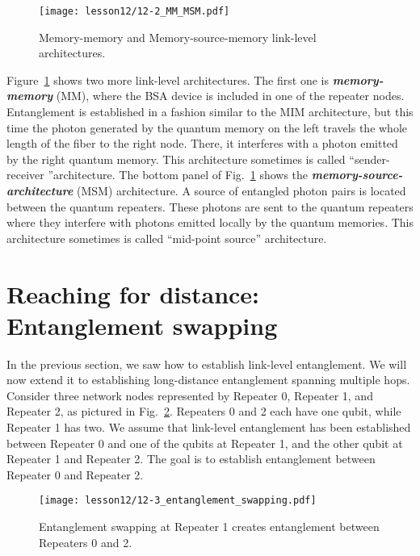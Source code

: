 \begin{figure}[t]
    \centering
    \texttt{[image: lesson12/12-2\_MM\_MSM.pdf]}
    \caption[MM and MSM architectures.]{Memory-memory and Memory-source-memory link-level architectures.}
    \label{fig:12-2_MM_MSM}
\end{figure}

Figure~\ref{fig:12-2_MM_MSM} shows two more link-level architectures.
The first one is \textit{\textbf{memory-memory}} (MM), where the BSA device is included in one of the repeater nodes.
Entanglement is established in a fashion similar to the MIM architecture, but this time the photon generated by the quantum memory on the left travels the whole length of the fiber to the right node.
There, it interferes with a photon emitted by the right quantum memory.
This architecture sometimes is called ``sender-receiver ''architecture.
The bottom panel of Fig.~\ref{fig:12-2_MM_MSM} shows the \textit{\textbf{memory-source-architecture}} (MSM) architecture.
A source of entangled photon pairs is located between the quantum repeaters.
These photons are sent to the quantum repeaters where they interfere with photons emitted locally by the quantum memories. This architecture sometimes is called ``mid-point source'' architecture.


\section{Reaching for distance: Entanglement swapping}
\label{sec:12-3_reaching_for_distance}

In the previous section, we saw how to establish link-level entanglement.
We will now extend it to establishing long-distance entanglement spanning multiple hops.
Consider three network nodes represented by Repeater 0, Repeater 1, and Repeater 2, as pictured in Fig.~\ref{fig:12-3_entanglement_swapping}.
Repeaters 0 and 2 each have one qubit, while Repeater 1 has two.
We assume that link-level entanglement has been established between Repeater 0 and one of the qubits at Repeater 1, and the other qubit at Repeater 1 and Repeater 2.
The goal is to establish entanglement between Repeater 0 and Repeater 2.

\begin{figure}[t]
    \centering
    \texttt{[image: lesson12/12-3\_entanglement\_swapping.pdf]}
    \caption[Entanglement swapping.]{Entanglement swapping at Repeater 1 creates entanglement between Repeaters 0 and 2.}
    \label{fig:12-3_entanglement_swapping}
\end{figure}

